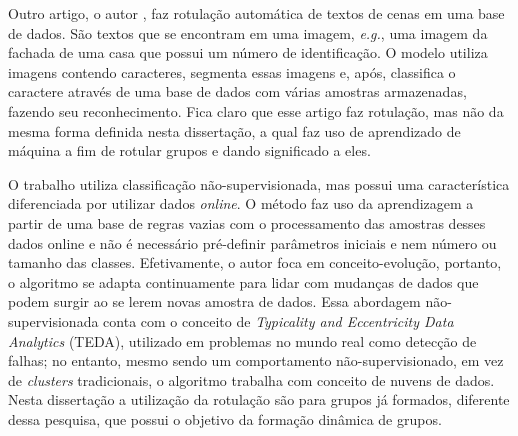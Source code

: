 Outro artigo, o autor \cite{Iwamura2013}, faz rotulação automática de textos de cenas em uma base de dados. São textos que se encontram em uma imagem, \textit{e.g.}, uma imagem da fachada de uma casa que possui um número de identificação. O modelo utiliza imagens contendo caracteres, segmenta essas imagens e, após, classifica o caractere através de uma base de dados com várias amostras armazenadas, fazendo seu reconhecimento. Fica claro que esse artigo faz rotulação, mas não da mesma forma definida nesta dissertação, a qual faz uso de aprendizado de máquina a fim de rotular grupos e dando significado a eles. 


O trabalho \cite{Costa2016} utiliza classificação não-supervisionada, mas possui uma característica diferenciada por utilizar dados \textit{online}. O método faz uso da aprendizagem a partir de uma base de regras vazias com o processamento das amostras desses dados online e não é necessário pré-definir parâmetros iniciais e nem número ou tamanho das classes. Efetivamente, o autor foca em conceito-evolução, portanto, o algoritmo se adapta continuamente para lidar com mudanças de dados que podem surgir ao se lerem novas amostra de dados. Essa abordagem não-supervisionada conta com o conceito de \textit{Typicality and Eccentricity Data Analytics} (TEDA), utilizado em problemas no mundo real como detecção de falhas; no entanto, mesmo sendo um comportamento não-supervisionado, em vez de \textit{clusters} tradicionais, o algoritmo trabalha com conceito de nuvens de dados. Nesta dissertação a utilização da rotulação são para grupos já formados, diferente dessa pesquisa, que possui o objetivo da formação dinâmica de grupos.



